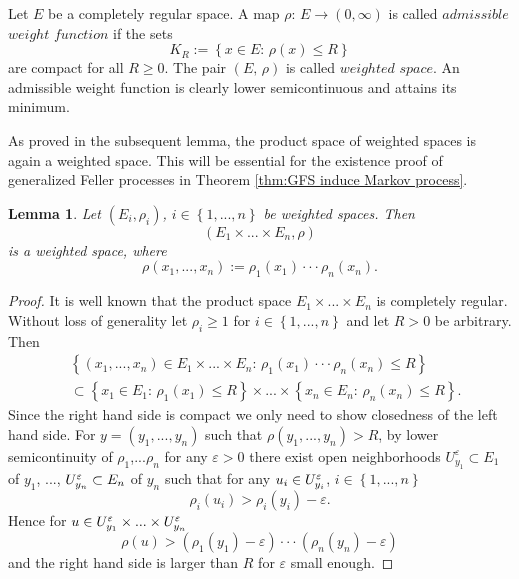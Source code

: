 \documentclass[a4paper,12pt]{article}
\newtheorem{lemma}[theorem]{Lemma}
\theoremstyle{definition}
\theoremstyle{remark}
\numberwithin{equation}{section}
\numberwithin{theorem}{section}
\begin{document}
Let $E$  be a completely regular space. A map $\rho:\,E\rightarrow\left(0,\infty\right)$ is called $\mathit{admissible}$
$\mathit{weight}$ $\mathit{function}$ if the sets 
\[
K_{R}:=\left\{ x\in E:\,\rho(x)\leq R\right\} 
\]
are compact for all $R\geq0$. The pair $\left(E,\,\rho\right)$ is
called $\mathit{weighted}$ $\mathit{space}$. An admissible weight function is clearly lower semicontinuous and attains its minimum. 





As proved in the subsequent lemma, the product space of weighted spaces is again a weighted space. This will be essential for the existence proof of generalized Feller processes in Theorem \ref{thm:GFS induce Markov process}.

\begin{lemma}
\label{lem:product space of weighted space is weighted space}Let
$\left(E_{i},\rho_{i}\right)$, $i\in\left\{ 1,...,n\right\} $ be
weighted spaces. Then 
\[
\left(E_{1}\times...\times E_{n},\rho\right)
\]
is a weighted space, where 
\[
\rho\left(x_{1},...,x_{n}\right):=\rho_{1}\left(x_{1}\right)\cdot\cdot\cdot\rho_{n}\left(x_{n}\right).
\]
\end{lemma}

\begin{proof} It is well known that the product space $E_{1}\times...\times E_{n}$ is completely regular. Without
loss of generality let $\rho_{i}\geq1$ for $i\in\left\{ 1,...,n\right\} $ and
let $R>0$ be arbitrary. Then 
\begin{align*}
 & \left\{ \left(x_{1},...,x_{n}\right)\in E_{1}\times...\times E_{n}:\,\rho_{1}\left(x_{1}\right)\cdot\cdot\cdot\rho_{n}\left(x_{n}\right)\leq R\right\} \\
 & \subset\left\{ x_{1}\in E_{1}:\,\rho_{1}\left(x_{1}\right)\leq R\right\} \times...\times\left\{ x_{n}\in E_{n}:\,\rho_{n}\left(x_{n}\right)\leq R\right\} .
\end{align*}
Since the right hand side is compact we only need to show closedness of the left hand side. For $y=\left(y_{1},...,y_{n}\right)$
such that $\rho\left(y_{1},...,y_{n}\right)>R$, by lower semicontinuity
of $\rho_{1}$,...$\rho_{n}$ for any $\varepsilon>0$ there exist open neighborhoods $U_{y_{1}}^{\varepsilon}\subset E_{1}$
of $y_{1}$, ..., $U_{y_{n}}^{\text{\ensuremath{\varepsilon}}}\subset E_{n}$
of $y_{n}$ such that for any $u_{i}\in U_{y_{i}}^{\text{\ensuremath{\varepsilon}}}$,
$i\in\left\{ 1,...,n\right\} $
\[
\rho_{i}(u_{i})>\rho_{i}(y_{i})-\varepsilon.
\]
Hence for $u\in U_{y_{1}}^{\varepsilon}\times...\times U_{y_{n}}^{\text{\ensuremath{\varepsilon}}}$
\[
\rho(u)>\left(\rho_{1}(y_{1})-\varepsilon\right)\cdot\cdot\cdot\left(\rho_{n}(y_{n})-\varepsilon\right)
\]
and the right hand side is larger than $R$ for $\varepsilon$ small
enough.
\end{proof}
\end{document}
